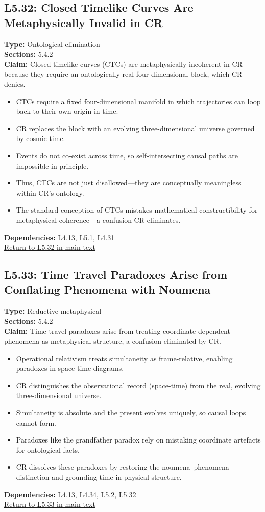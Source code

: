\documentclass[12pt]{book}
\newcommand{\returnlink}[1]{\hyperref[logic:#1]{Return to #1 in main text}\xspace}
\begin{document}
\subsection*{L5.32: Closed Timelike Curves Are Metaphysically Invalid in CR}
\label{appendix:L5.32}
\textbf{Type:} Ontological elimination \\
\textbf{Sections:} 5.4.2 \\
\textbf{Claim:} Closed timelike curves (CTCs) are metaphysically incoherent in CR because they require an ontologically real four-dimensional block, which CR denies.
\begin{itemize}
  \item CTCs require a fixed four-dimensional manifold in which trajectories can loop back to their own origin in time.
  \item CR replaces the block with an evolving three-dimensional universe governed by cosmic time.
  \item Events do not co-exist across time, so self-intersecting causal paths are impossible in principle.
  \item Thus, CTCs are not just disallowed---they are conceptually meaningless within CR's ontology.
  \item The standard conception of CTCs mistakes mathematical constructibility for metaphysical coherence---a confusion CR eliminates.
\end{itemize}
\textbf{Dependencies:} L4.13, L5.1, L4.31 \\
\returnlink{L5.32}

\subsection*{L5.33: Time Travel Paradoxes Arise from Conflating Phenomena with Noumena}
\label{appendix:L5.33}
\textbf{Type:} Reductive-metaphysical \\
\textbf{Sections:} 5.4.2 \\
\textbf{Claim:} Time travel paradoxes arise from treating coordinate-dependent phenomena as metaphysical structure, a confusion eliminated by CR.
\begin{itemize}
  \item Operational relativism treats simultaneity as frame-relative, enabling paradoxes in space-time diagrams.
  \item CR distinguishes the observational record (space-time) from the real, evolving three-dimensional universe.
  \item Simultaneity is absolute and the present evolves uniquely, so causal loops cannot form.
  \item Paradoxes like the grandfather paradox rely on mistaking coordinate artefacts for ontological facts.
  \item CR dissolves these paradoxes by restoring the noumena–phenomena distinction and grounding time in physical structure.
\end{itemize}
\textbf{Dependencies:} L4.13, L4.34, L5.2, L5.32 \\
\returnlink{L5.33}
\end{document}
